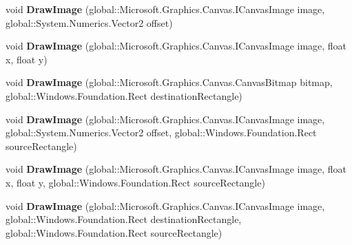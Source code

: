 \begin{DoxyCompactItemize}
void {\bfseries Draw\+Image} (global\+::\+Microsoft.\+Graphics.\+Canvas.\+I\+Canvas\+Image image, global\+::\+System.\+Numerics.\+Vector2 offset)
\item 
\mbox{\label{interface_microsoft_1_1_graphics_1_1_canvas_1_1_i_canvas_drawing_session_a00025470cb4a49490028c8a0f99be07b}} 
void {\bfseries Draw\+Image} (global\+::\+Microsoft.\+Graphics.\+Canvas.\+I\+Canvas\+Image image, float x, float y)
\item 
\mbox{\label{interface_microsoft_1_1_graphics_1_1_canvas_1_1_i_canvas_drawing_session_a217624e9b6fad3572752f97968e22579}} 
void {\bfseries Draw\+Image} (global\+::\+Microsoft.\+Graphics.\+Canvas.\+Canvas\+Bitmap bitmap, global\+::\+Windows.\+Foundation.\+Rect destination\+Rectangle)
\item 
\mbox{\label{interface_microsoft_1_1_graphics_1_1_canvas_1_1_i_canvas_drawing_session_a9daab3a40c2194f97c638edb082a9c04}} 
void {\bfseries Draw\+Image} (global\+::\+Microsoft.\+Graphics.\+Canvas.\+I\+Canvas\+Image image, global\+::\+System.\+Numerics.\+Vector2 offset, global\+::\+Windows.\+Foundation.\+Rect source\+Rectangle)
\item 
\mbox{\label{interface_microsoft_1_1_graphics_1_1_canvas_1_1_i_canvas_drawing_session_a397cb8eca23ad1da1455e9c0f2c950e7}} 
void {\bfseries Draw\+Image} (global\+::\+Microsoft.\+Graphics.\+Canvas.\+I\+Canvas\+Image image, float x, float y, global\+::\+Windows.\+Foundation.\+Rect source\+Rectangle)
\item 
\mbox{\label{interface_microsoft_1_1_graphics_1_1_canvas_1_1_i_canvas_drawing_session_a7eadc4d8ba4b2ff60ad5e82583afa018}} 
void {\bfseries Draw\+Image} (global\+::\+Microsoft.\+Graphics.\+Canvas.\+I\+Canvas\+Image image, global\+::\+Windows.\+Foundation.\+Rect destination\+Rectangle, global\+::\+Windows.\+Foundation.\+Rect source\+Rectangle)
\item 
\mbox{\label{interface_microsoft_1_1_graphics_1_1_canvas_1_1_i_canvas_drawing_session_ac7b5a66f8426e0e819dd7e8e14011132}} 

\end{DoxyCompactItemize}
